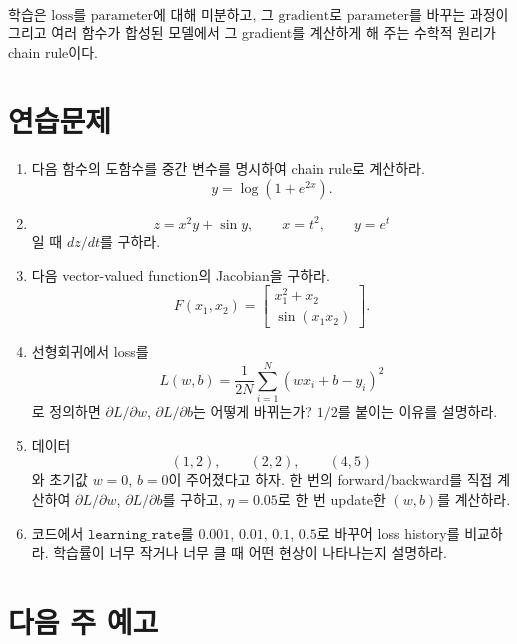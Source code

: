 \documentclass[11pt,a4paper]{article}
\begin{document}
\begin{keybox}[이번 주의 한 문장]
\[
\boxed{
\text{학습은 loss를 parameter에 대해 미분하고, 그 gradient로 parameter를 바꾸는 과정이다.}
}
\]
그리고 여러 함수가 합성된 모델에서 그 gradient를 계산하게 해 주는 수학적 원리가 chain rule이다.
\end{keybox}

\section{연습문제}

\begin{enumerate}[label=\textbf{\arabic*.},leftmargin=2.2em]
\item 다음 함수의 도함수를 중간 변수를 명시하여 chain rule로 계산하라.
\[
y=\log\left(1+e^{2x}\right).
\]

\item
\[
z=x^2y+\sin y,
\qquad
x=t^2,
\qquad
y=e^t
\]
일 때 $dz/dt$를 구하라.

\item 다음 vector-valued function의 Jacobian을 구하라.
\[
F(x_1,x_2)
=
\begin{bmatrix}
x_1^2+x_2\\
\sin(x_1x_2)
\end{bmatrix}.
\]

\item 선형회귀에서 loss를
\[
L(w,b)=\frac{1}{2N}\sum_{i=1}^N(wx_i+b-y_i)^2
\]
로 정의하면 $\partial L/\partial w$, $\partial L/\partial b$는 어떻게 바뀌는가?
$1/2$를 붙이는 이유를 설명하라.

\item 데이터
\[
(1,2),\qquad(2,2),\qquad(4,5)
\]
와 초기값 $w=0$, $b=0$이 주어졌다고 하자. 한 번의 forward/backward를 직접 계산하여
$\partial L/\partial w$, $\partial L/\partial b$를 구하고, $\eta=0.05$로 한 번 update한 $(w,b)$를 계산하라.

\item 코드에서 $\texttt{learning\_rate}$를 $0.001$, $0.01$, $0.1$, $0.5$로 바꾸어 loss history를 비교하라.
학습률이 너무 작거나 너무 클 때 어떤 현상이 나타나는지 설명하라.
\end{enumerate}

\section*{다음 주 예고}
\end{document}
